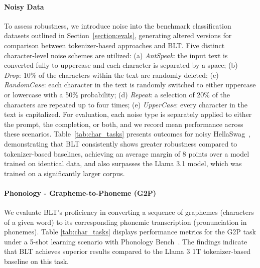 \paragraph{Noisy Data} To assess robustness, we introduce noise into the benchmark classification datasets outlined in Section~\ref{section:evals}, generating altered versions for comparison between tokenizer-based approaches and {\textsc BLT}. Five distinct character-level noise schemes are utilized: (a) \textit{AntSpeak}: the input text is converted fully to uppercase and each character is separated by a space; (b) \textit{Drop}: 10\% of the characters within the text are randomly deleted; (c) \textit{RandomCase}: each character in the text is randomly switched to either uppercase or lowercase with a 50\% probability; (d) \textit{Repeat}: a selection of 20\% of the characters are repeated up to four times; (e) \textit{UpperCase}: every character in the text is capitalized. For evaluation, each noise type is separately applied to either the prompt, the completion, or both, and we record mean performance across these scenarios. Table~\ref{tab:char_tasks} presents outcomes for noisy HellaSwag~\citep{Eval_hellaswag}, demonstrating that {\textsc BLT} consistently shows greater robustness compared to tokenizer-based baselines, achieving an average margin of 8 points over a model trained on identical data, and also surpasses the Llama 3.1 model, which was trained on a significantly larger corpus.

\paragraph{Phonology - Grapheme-to-Phoneme (G2P)} We evaluate {\textsc BLT}'s proficiency in converting a sequence of graphemes (characters of a given word) to its corresponding phonemic transcription (pronunciation in phonemes). Table \ref{tab:char_tasks} displays performance metrics for the G2P task under a 5-shot learning scenario with Phonology Bench~\citep{suvarna2024phonologybench}. The findings indicate that {\textsc BLT} achieves superior results compared to the Llama 3 1T tokenizer-based baseline on this task.

